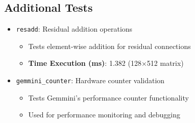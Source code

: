 \subsection{Additional Tests}
\begin{itemize}
\item \texttt{resadd}: Residual addition operations
  \begin{itemize}
  \item Tests element-wise addition for residual connections
  \item \textbf{Time Execution (ms)}: 1.382 (128$\times$512 matrix)
  \end{itemize}

\item \texttt{gemmini\_counter}: Hardware counter validation
  \begin{itemize}
  \item Tests Gemmini's performance counter functionality
  \item Used for performance monitoring and debugging
  \end{itemize}
\end{itemize}

